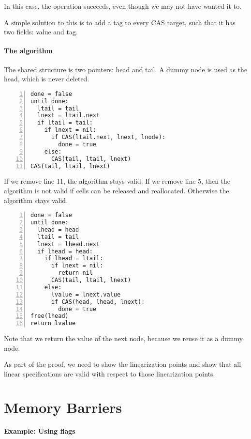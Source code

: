 \documentclass{idc_msc}
\begin{document}
In this case, the operation succeeds, even though we may not have wanted it to.

A simple solution to this is to add a tag to every CAS target, such that it has two fields: value and tag.

\paragraph{The algorithm}

The shared structure is two pointers: head and tail.
A dummy node is used as the head, which is never deleted.

\begin{lstlisting}[frame=L,mathescape=true,numbers=left,title=Enqueue]
done = false
until done:
  ltail = tail
  lnext = ltail.next
  if ltail = tail:
    if lnext = nil:
      if CAS(ltail.next, lnext, lnode):
        done = true
    else:
      CAS(tail, ltail, lnext)
CAS(tail, ltail, lnext)
\end{lstlisting}

If we remove line 11, the algorithm stays valid.
If we remove line 5, then the algorithm is not valid if cells can be released and reallocated. Otherwise the algorithm stays valid.

\begin{lstlisting}[frame=L,mathescape=true,numbers=left,title=Dequeue]
done = false
until done:
  lhead = head
  ltail = tail
  lnext = lhead.next
  if lhead = head:
    if lhead = ltail:
      if lnext = nil:
        return nil
      CAS(tail, ltail, lnext)
    else:
      lvalue = lnext.value
      if CAS(head, lhead, lnext):
        done = true
free(lhead)
return lvalue
\end{lstlisting}

Note that we return the value of the next node, because we reuse it as a dummy node.

As part of the proof, we need to show the linearization points and show that all linear specifications are valid with respect to those linearization points.

\section{Memory Barriers}

\paragraph{Example: Using flags}
\end{document}
